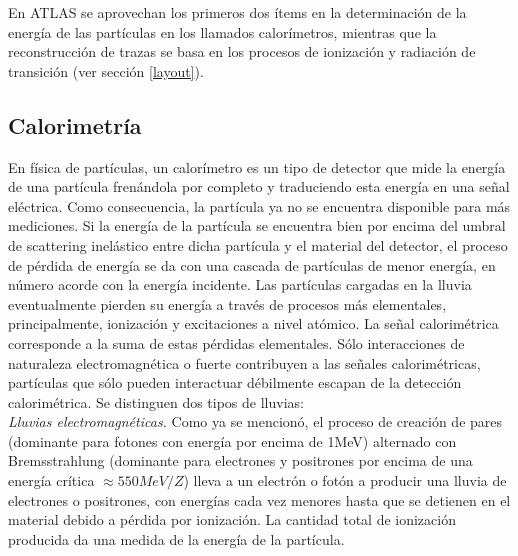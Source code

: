 En ATLAS se aprovechan los primeros dos ítems en la determinación de la energía de las partículas en los llamados calorímetros, mientras que la reconstrucción de trazas se basa en los procesos de ionización y radiación de transición (ver sección \ref{layout}).

\subsection{Calorimetría}\label{Lluvias}

En física de partículas, un calorímetro es un tipo de detector que mide la energía de una partícula frenándola por completo y traduciendo esta energía en una señal eléctrica. Como consecuencia, la partícula ya no se encuentra disponible para más mediciones. Si la energía de la partícula se encuentra bien por encima del umbral de scattering inelástico entre dicha partícula y el material del detector, el proceso de pérdida de energía se da con una cascada de partículas de menor energía, en número acorde con la energía incidente. Las partículas cargadas en la lluvia eventualmente pierden su energía a través de procesos más elementales, principalmente, ionización y excitaciones a nivel atómico. La señal calorimétrica corresponde a la suma de estas pérdidas elementales. Sólo interacciones de naturaleza electromagnética o fuerte contribuyen a las señales calorimétricas, partículas que sólo pueden interactuar débilmente escapan de la detección calorimétrica. Se distinguen dos tipos de lluvias:\\


\indent \emph{Lluvias electromagnéticas.} Como ya se mencionó, el proceso de creación de pares (dominante para fotones con energía por encima de 1MeV) alternado con Bremsstrahlung (dominante para electrones y positrones por encima de una energía crítica $\approx 550 MeV/Z$) lleva a un electrón o fotón a producir una lluvia de electrones o positrones, con energías cada vez menores hasta que se detienen en el material debido a pérdida por ionización. La cantidad total de ionización producida da una medida de la energía de la partícula.\\
 
